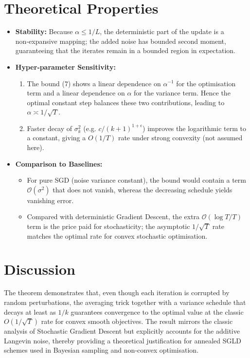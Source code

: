 \documentclass[11pt]{article}
\begin{document}
\section*{Theoretical Properties}
\begin{itemize}
\item \textbf{Stability:} Because $\alpha\le 1/L$, the deterministic part of the
update is a non‑expansive mapping; the added noise has bounded second
moment, guaranteeing that the iterates remain in a bounded region in
expectation.
\item \textbf{Hyper‑parameter Sensitivity:}
    \begin{enumerate}
        \item The bound (7) shows a linear dependence on $\alpha^{-1}$ for the
        optimisation term and a linear dependence on $\alpha$ for the
        variance term. Hence the optimal constant step balances these two
        contributions, leading to $\alpha\asymp 1/\sqrt{T}$.
        \item Faster decay of $\sigma_{k}^{2}$ (e.g. $c/(k+1)^{1+\epsilon}$)
        improves the logarithmic term to a constant, giving a $O(1/T)$ rate
        under strong convexity (not assumed here).
    \end{enumerate}
\item \textbf{Comparison to Baselines:}
    \begin{itemize}
        \item For pure SGD (noise variance constant), the bound would contain a
        term $\mathcal{O}(\sigma^{2})$ that does not vanish, whereas the
        decreasing schedule yields vanishing error.
        \item Compared with deterministic Gradient Descent, the extra
        $\mathcal{O}(\log T/T)$ term is the price paid for stochasticity; the
        asymptotic $1/\sqrt{T}$ rate matches the optimal rate for convex
        stochastic optimisation.
    \end{itemize}
\end{itemize}

\section*{Discussion}
The theorem demonstrates that, even though each iteration is corrupted by
random perturbations, the averaging trick together with a variance schedule
that decays at least as $1/k$ guarantees convergence to the optimal value at
the classic $O(1/\sqrt{T})$ rate for convex smooth objectives. The result
mirrors the classic analysis of Stochastic Gradient Descent but
explicitly accounts for the additive Langevin noise, thereby providing a
theoretical justification for annealed SGLD schemes used in Bayesian
sampling and non‑convex optimisation.
\end{document}
